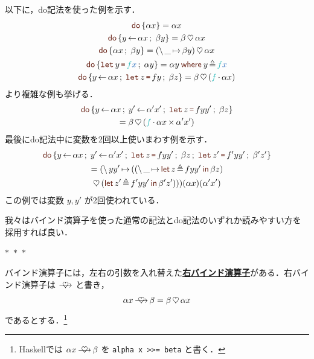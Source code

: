 \documentclass[a5paper,twoside,fleqn,draft]{jsbook}
\def\keywordColor{Sepia}
\def\varColor{NavyBlue}
\def\funcColor{BlueGreen}
\newcommand{\separator}{\begin{center}$*$~$*$~$*$\end{center}}
\newcommand{\programminglanguage}[1]{\textsf{#1}}
\newcommand{\haskell}{\programminglanguage{Haskell}}
\newcommand{\keyword}[1]{{\underline{\textbf{#1}}}}
\newcommand{\code}[1]{\texttt{#1}}
\newcommand{\mKeyword}[1]{\textcolor{\keywordColor}{\mathsf{#1}}}
\newcommand{\mVarKeyword}[1]{\textcolor{\keywordColor}{\texttt{#1}}}
\newcommand{\mDoKeyword}{\mKeyword{do}}
\newcommand{\mDoLetKeyword}{\mVarKeyword{let}}
\newcommand{\mInKeyword}{\mKeyword{in}}
\newcommand{\mLetKeyword}{\mKeyword{let}}
\newcommand{\mWhereKeyword}{\mKeyword{where}}
\DeclareMathOperator{\mDoKW}{\mDoKeyword}
\DeclareMathOperator{\mLet}{\mLetKeyword}
\DeclareMathOperator{\mLetIn}{\mInKeyword}
\newcommand{\mVar}[1]{\textcolor{\varColor}{#1}}
\newcommand{\mXVar}{\mVar{x}}
\newcommand{\mFunc}[1]{\textcolor{\funcColor}{#1}}
\newcommand{\mFFunc}{{\mFunc{f}}}
\DeclareMathOperator{\mAppMap}{\times}
\DeclareMathOperator{\mBind}{\heartsuit}
\DeclareMathOperator{\mBindRight}{\ooalign{$\longrightarrow$\crcr\hss$\mBind$\hss}}
\DeclareMathOperator{\mDoEq}{\leftarrow}
\DeclareMathOperator{\mDoLetEq}{\mVarKeyword{=}}
\DeclareMathOperator{\mDoNext}{;\;}
\DeclareMathOperator{\mLambda}{\backslash}
\DeclareMathOperator{\mLambdaArrow}{\mapsto}
\DeclareMathOperator{\mLetEq}{\triangleq}
\DeclareMathOperator{\mMap}{\cdot}
\newcommand{\mDo}[1]{\mDoKW\left\{#1\right\}}
\newcommand{\mDoLet}[2]{\mathop{\mDoLetKeyword}#1\mDoLetEq#2}
\newcommand{\mLambdaEXP}[2]{\mLambda{#1}\mLambdaArrow{#2}} %
\newcommand{\mLetInEXP}[3]{\mLet#1\mLetEq#2\mLetIn{#3}} %
\newcommand{\mWhereIsEXP}[2]{\mathbin{\mWhereKeyword}#1\mLetEq#2} %
\begin{document}
以下に，do記法を使った例を示す．
\begin{gather}
\mDo{\alpha x}=\alpha x\\
\mDo{y\mDoEq\alpha x\mDoNext\beta y}=\beta\mBind\alpha x\\
\mDo{\alpha x\mDoNext\beta y}=(\mLambdaEXP{\_}{\beta y})\mBind \alpha x\label{eq:do-alpha-beta}\\
\mDo{\mDoLet{y}{\mFFunc\mXVar}\mDoNext\alpha y}=\alpha y\mWhereIsEXP{y}{\mFFunc\mXVar}\\
\mDo{y\mDoEq\alpha x\mDoNext\mDoLet{z}{fy}\mDoNext\beta z}
=\beta\mBind{}(\mFFunc\mMap\alpha x)
\end{gather}
より複雑な例も挙げる．
\begin{multline}
\mDo{y\mDoEq\alpha x\mDoNext y'\mDoEq\alpha'x'\mDoNext\mDoLet{z}{fyy'}
\mDoNext\beta z}\\
=\beta\mBind{}(\mFFunc\mMap\alpha x\mAppMap\alpha'x')
\end{multline}
最後にdo記法中に変数を2回以上使いまわす例を示す．
\begin{multline}
\mDo{y\mDoEq\alpha x\mDoNext y'\mDoEq\alpha'x'\mDoNext\mDoLet{z}{fyy'}\mDoNext\beta z\mDoNext\mDoLet{z'}{f'yy'}\mDoNext\beta'z'}\\
=(\mLambda yy'\mLambdaArrow{}((\mLambdaEXP{\_}{\mLetInEXP{z}{fyy'}{\beta z}})\\
\mBind{}(\mLetInEXP{z'}{f'yy'}{\beta'z'}))) (\alpha x)(\alpha'x')
\end{multline}
この例では変数 $y,y'$ が2回使われている．


我々はバインド演算子を使った通常の記法とdo記法のいずれか読みやすい方を採用すれば良い．



\separator

バインド演算子には，左右の引数を入れ替えた\keyword{右バインド演算子}がある．右バインド演算子は $\mBindRight$ と書き，
\begin{equation}
\alpha x\mBindRight\beta=\beta\mBind\alpha x
\end{equation}
であるとする．\footnote{\haskell では $\alpha x\mBindRight\beta$ を \code{alpha x >>= beta} と書く．}
\end{document}
